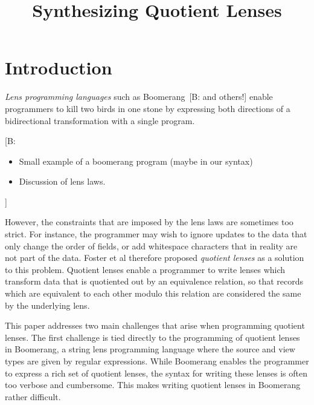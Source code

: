 \documentclass{svproc}
\newcommand{\FINISH}[3]{\ifdraft\textcolor{#1}{[#2: #3]}\fi}
\newcommand{\bcp}[1]{\FINISH{dkred}{B}{#1}}
\begin{document}
\mainmatter              %
%
\title{Synthesizing Quotient Lenses}
%
%
\author{}
%
\authorrunning{} %
%
\tocauthor{}
%
\institute{}

\maketitle              %

\begin{abstract}

\end{abstract}

\section{Introduction}

{\em Lens programming languages} such as
Boomerang~\cite{Boomerang}\bcp{and others!} enable programmers to kill two
birds in one stone by expressing both directions of a bidirectional
transformation with a single program.  

\bcp{
  \begin{itemize}
  \item Small example of a boomerang program (maybe in our syntax)
  \item Discussion of lens laws.
  \end{itemize}
}

However, the constraints that are imposed by the lens laws are sometimes too
strict. 
For instance, the programmer may wish to ignore updates to the data that only
change the order of fields, or add whitespace characters that in reality are not
part of the data. Foster et al therefore proposed \textit{quotient lenses} as a
solution to this problem. Quotient lenses enable a programmer to write lenses
which transform data that is quotiented out by an equivalence relation, so that
records which are equivalent to each other modulo this relation are considered
the same by the underlying lens.

This paper addresses two main challenges that arise when programming quotient
lenses. The first challenge is tied directly to the programming of quotient
lenses in Boomerang, a string lens programming language where the source and
view types are given by regular expressions. While Boomerang enables the
programmer to express a rich set of quotient lenses, the syntax for writing
these lenses is often too verbose and cumbersome. This makes writing quotient
lenses in Boomerang rather difficult.
\end{document}

